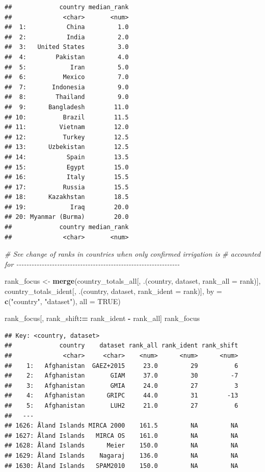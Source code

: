 \documentclass[
  11pt,
]{article}
\newenvironment{Shaded}{\begin{snugshade}}{\end{snugshade}}
\newcommand{\AttributeTok}[1]{\textcolor[rgb]{0.13,0.29,0.53}{#1}}
\newcommand{\CommentTok}[1]{\textcolor[rgb]{0.56,0.35,0.01}{\textit{#1}}}
\newcommand{\ConstantTok}[1]{\textcolor[rgb]{0.56,0.35,0.01}{#1}}
\newcommand{\FunctionTok}[1]{\textcolor[rgb]{0.13,0.29,0.53}{\textbf{#1}}}
\newcommand{\NormalTok}[1]{#1}
\newcommand{\OtherTok}[1]{\textcolor[rgb]{0.56,0.35,0.01}{#1}}
\newcommand{\SpecialCharTok}[1]{\textcolor[rgb]{0.81,0.36,0.00}{\textbf{#1}}}
\newcommand{\StringTok}[1]{\textcolor[rgb]{0.31,0.60,0.02}{#1}}
\begin{document}
\begin{verbatim}
##             country median_rank
##              <char>       <num>
##  1:           China         1.0
##  2:           India         2.0
##  3:   United States         3.0
##  4:        Pakistan         4.0
##  5:            Iran         5.0
##  6:          Mexico         7.0
##  7:       Indonesia         9.0
##  8:        Thailand         9.0
##  9:      Bangladesh        11.0
## 10:          Brazil        11.5
## 11:         Vietnam        12.0
## 12:          Turkey        12.5
## 13:      Uzbekistan        12.5
## 14:           Spain        13.5
## 15:           Egypt        15.0
## 16:           Italy        15.5
## 17:          Russia        15.5
## 18:      Kazakhstan        18.5
## 19:            Iraq        20.0
## 20: Myanmar (Burma)        20.0
##             country median_rank
##              <char>       <num>
\end{verbatim}

\begin{Shaded}
\begin{Highlighting}[]
\CommentTok{\# See change of ranks in countries when only confirmed irrigation is }
\CommentTok{\# accounted for {-}{-}{-}{-}{-}{-}{-}{-}{-}{-}{-}{-}{-}{-}{-}{-}{-}{-}{-}{-}{-}{-}{-}{-}{-}{-}{-}{-}{-}{-}{-}{-}{-}{-}{-}{-}{-}{-}{-}{-}{-}{-}{-}{-}{-}{-}{-}{-}{-}{-}{-}{-}{-}{-}{-}{-}{-}{-}{-}{-}{-}{-}{-}{-}}

\NormalTok{rank\_focus }\OtherTok{\textless{}{-}} \FunctionTok{merge}\NormalTok{(country\_totals\_all[, .(country, dataset, }\AttributeTok{rank\_all =}\NormalTok{ rank)],}
\NormalTok{                    country\_totals\_ident[, .(country, dataset, }\AttributeTok{rank\_ident =}\NormalTok{ rank)],}
                    \AttributeTok{by =} \FunctionTok{c}\NormalTok{(}\StringTok{"country"}\NormalTok{, }\StringTok{"dataset"}\NormalTok{), }\AttributeTok{all =} \ConstantTok{TRUE}\NormalTok{)}

\NormalTok{rank\_focus[, rank\_shift}\SpecialCharTok{:=}\NormalTok{ rank\_ident }\SpecialCharTok{{-}}\NormalTok{ rank\_all]}
\NormalTok{rank\_focus}
\end{Highlighting}
\end{Shaded}

\begin{verbatim}
## Key: <country, dataset>
##             country    dataset rank_all rank_ident rank_shift
##              <char>     <char>    <num>      <num>      <num>
##    1:   Afghanistan  GAEZ+2015     23.0         29          6
##    2:   Afghanistan       GIAM     37.0         30         -7
##    3:   Afghanistan       GMIA     24.0         27          3
##    4:   Afghanistan      GRIPC     44.0         31        -13
##    5:   Afghanistan       LUH2     21.0         27          6
##   ---                                                        
## 1626: Åland Islands MIRCA 2000    161.5         NA         NA
## 1627: Åland Islands   MIRCA OS    161.0         NA         NA
## 1628: Åland Islands      Meier    150.0         NA         NA
## 1629: Åland Islands    Nagaraj    136.0         NA         NA
## 1630: Åland Islands   SPAM2010    150.0         NA         NA
\end{verbatim}
\end{document}
